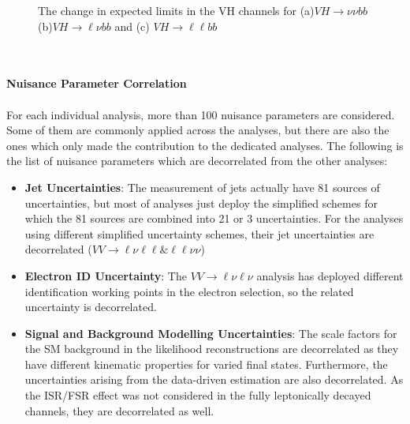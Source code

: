 \begin{figure}[ht]
	\centering
		
	\caption{The change in expected limits in the VH channels for (a)$VH\to\nu\nu bb$ (b)$VH\to\ell\nu bb$ and (c) $VH\to\ell\ell bb$ }
	\label{Fig:limits_Hbb}
\end{figure}
\noindent
\\
\\{\bf Nuisance Parameter Correlation}
\\
\\For each individual analysis, more than 100 nuisance parameters are considered. Some of them are commonly applied across the analyses, but there are also the ones which only made the contribution to the dedicated analyses. The following is the list of nuisance parameters which are decorrelated from the other analyses:
\begin{itemize}
	\item[] {\bf Jet Uncertainties}: The measurement of jets actually have 81 sources of uncertainties, but most of analyses just deploy the simplified schemes for which the 81 sources are combined into 21 or 3 uncertainties. For the analyses using different simplified uncertainty schemes, their jet uncertainties are decorrelated ($VV\to\ell\nu\ell\ell\&\ell\ell\nu\nu$)
	\item[] {\bf Electron ID Uncertainty}: The  $VV\to\ell\nu\ell\nu$ analysis has deployed different identification working points in the electron selection, so the related uncertainty is decorrelated. 
	\item[] {\bf Signal and Background Modelling Uncertainties}: The scale factors for the SM background in the likelihood reconstructions are decorrelated as they have different kinematic properties for varied final states. Furthermore, the uncertainties arising from the data-driven estimation are also decorrelated. As the ISR/FSR effect was not considered in the fully leptonically decayed channels, they are decorrelated as well.  
\end{itemize}
